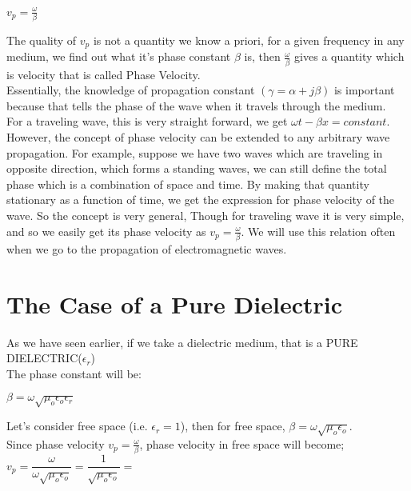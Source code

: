 		\begin{center}
		$ v_p=\frac{\omega}{\beta} $
	\end{center}
		
		The quality of $ v_p $ is not a quantity we know a priori, for a given frequency in any medium, we find out what it's phase constant $\beta  $ is, then $\frac{\omega}{\beta}$ gives a quantity which is velocity that is called Phase Velocity.\\
		
		Essentially, the knowledge of propagation constant $(\gamma=\alpha+j\beta)$ is important because that tells the phase of the wave when it travels through the medium.\\
		For a traveling wave, this is very straight forward, we get $ \omega t-\beta x=constant $. However, the concept of phase velocity can be extended to any arbitrary wave propagation. For example, suppose we have two waves which are traveling in opposite direction, which forms a standing waves, we can still define the total phase which is a combination of space and time. By making that quantity stationary as a function of time, we get the expression for phase velocity of the wave. So the concept is very general, Though for traveling wave it is very simple, and so we easily get its phase velocity as $v_p=\frac{\omega}{\beta}.$ We will use this relation often when we go to the propagation of electromagnetic waves.\newline
		
		\section{\textbf{The Case of a Pure Dielectric}}
		
		As we have seen earlier, if we take a dielectric medium, that is a PURE DIELECTRIC($\epsilon_{r}$)\\
		
		The phase constant will be:
		
		\begin{center}
		$\beta=\omega\sqrt{\mu_{o}\epsilon_{o}\epsilon_{r}}$ 
	\end{center}
		
		Let's consider free space (i.e. $\epsilon_{r}=1 $), then for free space, $\beta=\omega\sqrt{\mu_{o}\epsilon_{o}}$.\\
		Since phase velocity $v_p=\frac{\omega}{\beta}$, phase velocity in free space will become;\\
		
		$v_p=\dfrac{\omega}{\omega\sqrt{\mu_{o}\epsilon_{o}}}=\dfrac{1}{\sqrt{\mu_{o}\epsilon_{o}}}=$ 
		
